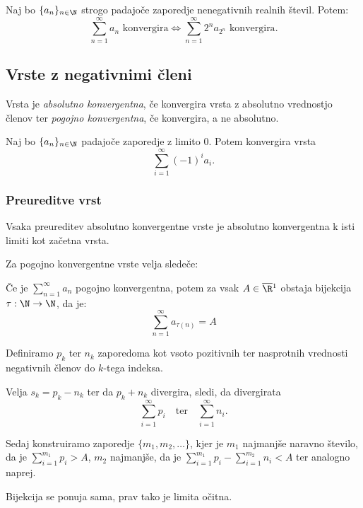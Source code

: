 \documentclass[12pt, a4paper, unicode]{article}
\begin{document}
\begin{izrek}
Naj bo $\{a_n\}_{n \in \N}$ strogo padajoče zaporedje nenegativnih realnih števil. Potem:
$$\sum_{n=1}^{\infty} a_n \text{ konvergira} \iff \sum_{n=1}^{\infty} 2^n a_{2^n} \text{ konvergira}.$$
\end{izrek}

\newpage
\subsection{Vrste z negativnimi členi}

\begin{definicija}
Vrsta je \textit{absolutno konvergentna}, če konvergira vrsta z absolutno vrednostjo členov ter \textit{pogojno konvergentna}, če konvergira, a ne absolutno.
\end{definicija}

\begin{izrek}
Naj bo $\{a_n\}_{n \in \N}$ padajoče zaporedje z limito 0. Potem konvergira vrsta $$\sum_{i = 1}^{\infty} (-1)^i a_i.$$
\end{izrek}



\subsubsection{Preureditve vrst}
Vsaka preureditev absolutno konvergentne vrste je absolutno konvergentna k isti limiti kot začetna vrsta.

Za pogojno konvergentne vrste velja sledeče:
\begin{izrek}
Če je $\sum_{n = 1}^{\infty} a_n$ pogojno konvergentna, potem za vsak $A \in \overline{\R} \footnotemark$ obstaja bijekcija $\tau: \N \to \N$, da je: $$\sum_{n = 1}^{\infty} a_{\tau(n)} = A$$
\end{izrek}
\footnotetext{$\overline{\R} = \R \cup \{-\infty, \infty\}$}
\begin{oris}
Definiramo $p_k$ ter $n_k$ zaporedoma kot vsoto pozitivnih ter nasprotnih vrednosti negativnih členov do $k$-tega indeksa. 

Velja $s_k = p_k - n_k$ ter da $p_k + n_k$ divergira, sledi, da divergirata $$\sum_{i = 1}^{\infty}p_i \quad \text{ter} \quad \sum_{i=1}^{\infty}n_i .$$

Sedaj konstruiramo zaporedje $\{m_1, m_2, \dots\}$, kjer je $m_1$ najmanjše naravno število, da je $\sum_{i = 1}^{m_1}p_i > A$, $m_2$ najmanjše, da je $\sum_{i = 1}^{m_1}p_i - \sum_{i = 1}^{m_2}n_i < A$ ter analogno naprej. 

Bijekcija se ponuja sama, prav tako je limita očitna.
\end{oris}
\end{document}
